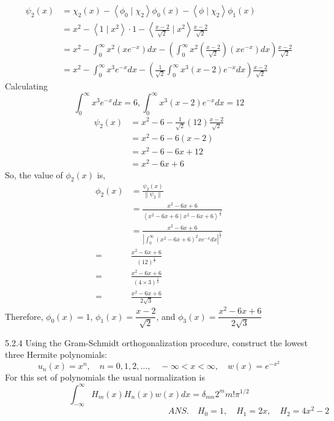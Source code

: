 $$
\begin{aligned}
\psi_{2}(x) &=\chi_{2}(x)-\left\langle\phi_{0} \mid \chi_{2}\right\rangle \phi_{0}(x)-\left\langle\phi \mid \chi_{2}\right\rangle \phi_{1}(x) \\
&=x^{2}-\left\langle 1 \mid x^{2}\right\rangle \cdot 1-\left\langle\frac{x-2}{\sqrt{2}} \mid x^{2}\right\rangle \frac{x-2}{\sqrt{2}} \\
&=x^{2}-\int_{0}^{\infty} x^{2}\left(x e^{-x}\right) d x-\left(\int_{0}^{\infty} x^{2}\left(\frac{x-2}{\sqrt{2}}\right)\left(x e^{-x}\right) d x\right) \frac{x-2}{\sqrt{2}} \\
&=x^{2}-\int_{0}^{\infty} x^{3} e^{-x} d x-\left(\frac{1}{\sqrt{2}} \int_{0}^{\infty} x^{3}(x-2) e^{-x} d x\right) \frac{x-2}{\sqrt{2}}
\end{aligned}
$$
Calculating
$$
\int_{0}^{\infty} x^{3} e^{-x} d x=6, \int_{0}^{\infty} x^{3}(x-2) e^{-x} d x=12
$$
$$
\begin{aligned}
\psi_{2}(x)&=x^{2}-6-\frac{1}{\sqrt{2}}(12) \frac{x-2}{\sqrt{2}} \\
&=x^{2}-6-6(x-2) \\
&=x^{2}-6-6 x+12 \\
&=x^{2}-6 x+6
\end{aligned}
$$
So, the value of $\phi_{2}(x)$ is,
$$
\begin{aligned}
\phi_{2}(x) &=\frac{\psi_{2}(x)}{\left\|\psi_{2}\right\|} \\
&=\frac{x^{2}-6 x+6}{\left\langle x^{2}-6 x+6 \mid x^{2}-6 x+6\right\rangle^{\frac{1}{2}}} \\
&=\frac{x^{2}-6 x+6}{\left|\int_{0}^{\infty}\left(x^{2}-6 x+6\right)^{2} x e^{-x} d x\right|^{\frac{1}{2}}} \\
=& \frac{x^{2}-6 x+6}{(12)^{\frac{1}{2}}} \\
=& \frac{x^{2}-6 x+6}{(4 \times 3)^{\frac{1}{2}}} \\
=& \frac{x^{2}-6 x+6}{2 \sqrt{3}}
\end{aligned}
$$
Therefore, $\phi_{0}(x)=1$, $\phi_{1}(x)=\dfrac{x-2}{\sqrt{2}}$, and $\phi_{3}(x)=\dfrac{x^{2}-6 x+6}{2 \sqrt{3}}$





\newpage

\begin{mybox}{5.2.4}
Using the Gram-Schmidt orthogonalization procedure, construct the lowest three Hermite polynomials:
$$
u_{n}(x)=x^{n}, \quad n=0,1,2, \ldots, \quad-\infty<x<\infty, \quad w(x)=e^{-x^{2}}
$$
For this set of polynomials the usual normalization is
$$
\int_{-\infty}^{\infty} H_{m}(x) H_{n}(x) w(x) d x=\delta_{m n} 2^{m} m ! \pi^{1 / 2}
$$
$$
\hspace{8cm} A N S . \quad H_{0}=1, \quad H_{1}=2 x, \quad H_{2}=4 x^{2}-2
$$
\end{mybox}

